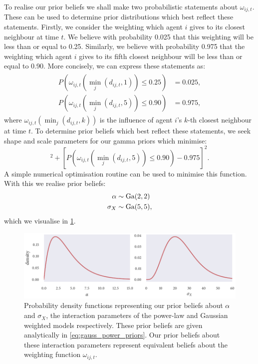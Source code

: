 To realise our prior beliefs we shall make two probabilistic statements about
$\omega_{ij,t}$. These can be used to determine prior distributions which best
reflect these statements. Firstly, we consider the weighting which agent $i$
gives to its closest neighbour at time $t$. We believe with probability 0.025
that this weighting will be less than or equal to 0.25. Similarly, we believe
with probability 0.975 that the weighting which agent $i$ gives to its fifth
closest neighbour will be less than or equal to 0.90. More concisely, we can
express these statements as:
\begin{align}
  \label{eq:omega_statements}
  \begin{split}
    P(\omega_{ij, t}({\min_j(d_{ij,t}, 1)}) \leq 0.25) & = 0.025, \\
    P(\omega_{ij, t}({\min_j(d_{ij,t}, 5)}) \leq 0.90) & = 0.975,
  \end{split}
\end{align}
where $\omega_{ij, t}({\min_j(d_{ij,t}, k)})$ is the influence of agent $i$'s
$k$-th closest neighbour at time $t$. To determine prior beliefs which best
reflect these statements, we seek shape and scale parameters for our gamma
priors which minimise:
\begin{equation*}
  [P(\omega_{ij, t}({\min_j(d_{ij,t}, 1)}) \leq 0.25) - 0.025]^2
  + [P(\omega_{ij, t}({\min_j(d_{ij,t}, 5)}) \leq 0.90) - 0.975]^2.
\end{equation*}
A simple numerical optimisation routine can be used to minimise this function.
With this we realise prior beliefs:
\begin{align}
  \label{eq:gauss_power_priors}
  \begin{split}
    \alpha   & \sim \textrm{Ga}(2, 2) \\
    \sigma_X & \sim \textrm{Ga}(5, 5),
  \end{split}
\end{align}
which we visualise in \cref{fig:gauss_power_priors}.

\begin{figure}[tbp]
  \includegraphics{gauss_power_priors.pdf}
  \caption{Probability density functions representing our prior beliefs about
    $\alpha$ and $\sigma_X$, the interaction parameters of the power-law and
    Gaussian weighted models respectively. These prior beliefs are given
    analytically in \cref{eq:gauss_power_priors}. Our prior beliefs about
    these interaction parameters represent equivalent beliefs about the
    weighting function $\omega_{ij,t}$.}
  \label{fig:gauss_power_priors}
\end{figure}

